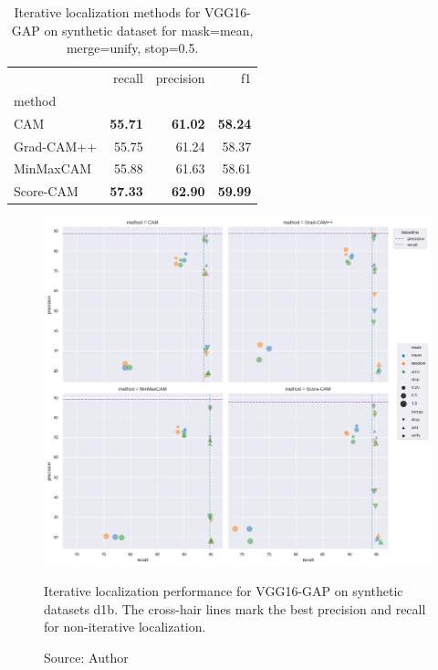 \begin{table}[ht]
\centering
\begin{tabular}{lrrr}
\toprule
 & recall & precision & f1 \\
method &  &  &  \\
\cmidrule(lr){1-1} \cmidrule(lr){2-4}
CAM & \color{purple} \bfseries 55.71 & \color{purple} \bfseries 61.02 & \color{purple} \bfseries 58.24 \\
Grad-CAM++ & 55.75 & 61.24 & 58.37 \\
MinMaxCAM & 55.88 & 61.63 & 58.61 \\
Score-CAM & \color{teal} \bfseries 57.33 & \color{teal} \bfseries 62.90 & \color{teal} \bfseries 59.99 \\
\bottomrule
\end{tabular}
\caption[Iterative localization methods for VGG16-GAP on synthetic dataset]{Iterative localization methods for VGG16-GAP on synthetic dataset for mask=mean, merge=unify, stop=0.5.}
\label{tab:iter_metrics_vgg16_cam_synthetic_all}
\end{table}

\begin{figure}[ht]
    \begin{center}       
    \includegraphics[width=1.0\textwidth]{images/fig_iter_vgg16_gap_syn_d1b.png}
    \caption[Iterative localization performance for VGG16-GAP on synthetic dataset d1b]{Iterative localization performance for VGG16-GAP on synthetic datasets d1b. The cross-hair lines mark the best precision and recall for non-iterative localization.}
    \caption*{Source: Author}
    \label{fig:prec_iter_vgg16_gap_syn_d1b}
    \end{center}
\end{figure}


